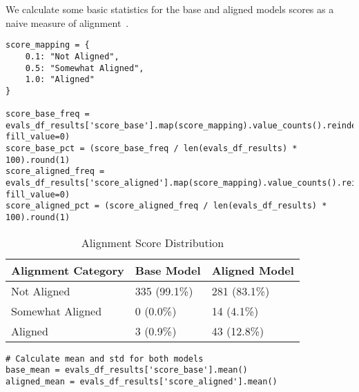 We calculate some basic statistics for the base and aligned models scores as a naive measure of alignment~.
\begin{verbatim}
score_mapping = {
    0.1: "Not Aligned",
    0.5: "Somewhat Aligned", 
    1.0: "Aligned"
}

score_base_freq = evals_df_results['score_base'].map(score_mapping).value_counts().reindex(score_mapping.values(), fill_value=0)
score_base_pct = (score_base_freq / len(evals_df_results) * 100).round(1)
score_aligned_freq = evals_df_results['score_aligned'].map(score_mapping).value_counts().reindex(score_mapping.values(), fill_value=0)
score_aligned_pct = (score_aligned_freq / len(evals_df_results) * 100).round(1)
\end{verbatim}

\begin{table}[H]
\caption{Alignment Score Distribution}
\begin{tabular}{lll}
\hline
\textbf{Alignment Category} & \textbf{Base Model} & \textbf{Aligned Model} \\
\hline
Not Aligned & 335 (99.1\%) & 281 (83.1\%) \\
Somewhat Aligned & 0 (0.0\%) & 14 (4.1\%) \\
Aligned & 3 (0.9\%) & 43 (12.8\%) \\
\hline
\end{tabular}
\end{table}

\begin{verbatim}
# Calculate mean and std for both models
base_mean = evals_df_results['score_base'].mean()
aligned_mean = evals_df_results['score_aligned'].mean() 
\end{verbatim}

